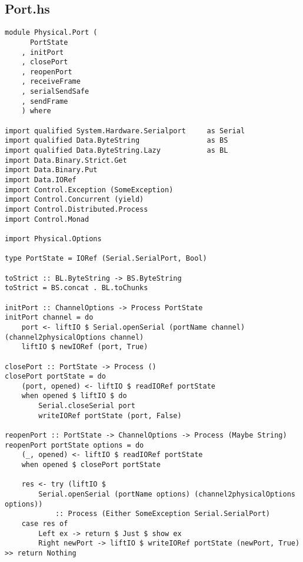 \documentclass[russian,utf8,simple,emptystyle]{eskdtext}
\begin{document}
\subsection{Port.hs}
\begin{lstlisting}
module Physical.Port (
      PortState
    , initPort
    , closePort
    , reopenPort
    , receiveFrame
    , serialSendSafe
    , sendFrame    
    ) where

import qualified System.Hardware.Serialport     as Serial
import qualified Data.ByteString                as BS
import qualified Data.ByteString.Lazy           as BL
import Data.Binary.Strict.Get 
import Data.Binary.Put 
import Data.IORef
import Control.Exception (SomeException)
import Control.Concurrent (yield)
import Control.Distributed.Process
import Control.Monad 

import Physical.Options

type PortState = IORef (Serial.SerialPort, Bool)

toStrict :: BL.ByteString -> BS.ByteString
toStrict = BS.concat . BL.toChunks

initPort :: ChannelOptions -> Process PortState
initPort channel = do
    port <- liftIO $ Serial.openSerial (portName channel) (channel2physicalOptions channel)
    liftIO $ newIORef (port, True)

closePort :: PortState -> Process ()
closePort portState = do
    (port, opened) <- liftIO $ readIORef portState
    when opened $ liftIO $ do 
        Serial.closeSerial port
        writeIORef portState (port, False)

reopenPort :: PortState -> ChannelOptions -> Process (Maybe String)
reopenPort portState options = do
    (_, opened) <- liftIO $ readIORef portState 
    when opened $ closePort portState

    res <- try (liftIO $ 
        Serial.openSerial (portName options) (channel2physicalOptions options)) 
            :: Process (Either SomeException Serial.SerialPort)
    case res of 
        Left ex -> return $ Just $ show ex 
        Right newPort -> liftIO $ writeIORef portState (newPort, True) >> return Nothing
    


\end{lstlisting}
\end{document}
